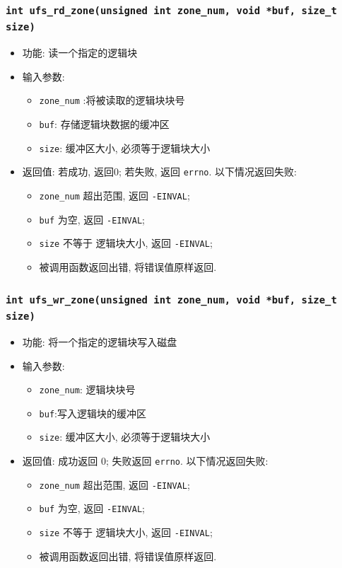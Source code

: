 \documentclass[nofonts]{ctexart}
\begin{document}
  \subsubsection[\texttt{ufs\_rd\_zone}]{\texttt{int ufs\_rd\_zone(unsigned int zone\_num, void *buf, size\_t size)}}
  \begin{itemize}
\item
  功能: 读一个指定的逻辑块
\item
  输入参数:

  \begin{itemize}
  \item
    \texttt{zone\_num} :将被读取的逻辑块块号
  \item
    \texttt{buf}: 存储逻辑块数据的缓冲区
  \item
    \texttt{size}: 缓冲区大小, 必须等于逻辑块大小
  \end{itemize}
\item
  返回值: 若成功, 返回0; 若失败, 返回 \texttt{errno}. 以下情况返回失败:

  \begin{itemize}
  \item
    \texttt{zone\_num} 超出范围, 返回 \texttt{-EINVAL};
  \item
    \texttt{buf} 为空, 返回 \texttt{-EINVAL};
  \item
    \texttt{size} 不等于 逻辑块大小, 返回 \texttt{-EINVAL};
  \item
    被调用函数返回出错, 将错误值原样返回.
  \end{itemize}
  \end{itemize}
  \subsubsection[\texttt{ufs\_wr\_zone}]{\texttt{int ufs\_wr\_zone(unsigned int zone\_num, void *buf, size\_t size)}}
  \begin{itemize}
\item
  功能: 将一个指定的逻辑块写入磁盘
\item
  输入参数:

  \begin{itemize}
  \item
    \texttt{zone\_num}: 逻辑块块号
  \item
    \texttt{buf}:写入逻辑块的缓冲区
  \item
    \texttt{size}: 缓冲区大小, 必须等于逻辑块大小
  \end{itemize}
\item
  返回值: 成功返回 0; 失败返回 \texttt{errno}. 以下情况返回失败:

  \begin{itemize}
  \item
    \texttt{zone\_num} 超出范围, 返回 \texttt{-EINVAL};
  \item
    \texttt{buf} 为空, 返回 \texttt{-EINVAL};
  \item
    \texttt{size} 不等于 逻辑块大小, 返回 \texttt{-EINVAL};
  \item
    被调用函数返回出错, 将错误值原样返回.
  \end{itemize}
  \end{itemize}
\end{document}
